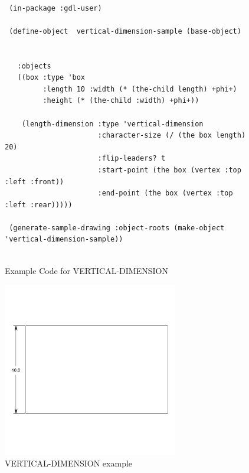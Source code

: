 \documentclass [11pt]{book}
\begin{document}
\begin{itemize}
\begin{figure}
\begin{lrbox}{\boxedverb}
\begin{minipage}{\linewidth}
{\begin{verbatim}        

 (in-package :gdl-user)
                   
 (define-object  vertical-dimension-sample (base-object)
  
  
   :objects
   ((box :type 'box
         :length 10 :width (* (the-child length) +phi+)
         :height (* (the-child :width) +phi+))
   
    (length-dimension :type 'vertical-dimension
                      :character-size (/ (the box length) 20)
                      :flip-leaders? t
                      :start-point (the box (vertex :top :left :front))
                      :end-point (the box (vertex :top :left :rear)))))

 (generate-sample-drawing :object-roots (make-object 'vertical-dimension-sample))


\end{verbatim}}
\end{minipage}
\end{lrbox}
\fbox{\usebox{\boxedverb}}

\caption{Example Code for VERTICAL-DIMENSION}

\label{fig:example-code-VERTICAL-DIMENSION}

\end{figure}

\begin{figure}
\begin{center}
\includegraphics[width=3in,height=3in]{../images/example-VERTICAL-DIMENSION.pdf}
\end{center}

\caption{VERTICAL-DIMENSION example}

\label{fig:VERTICAL-DIMENSION}

\end{figure}






\end{itemize}
\end{document}

